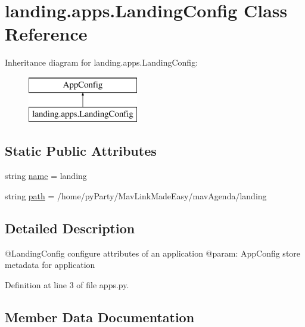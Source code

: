 \hypertarget{classlanding_1_1apps_1_1LandingConfig}{}\section{landing.\+apps.\+Landing\+Config Class Reference}
\label{classlanding_1_1apps_1_1LandingConfig}
Inheritance diagram for landing.\+apps.\+Landing\+Config\+:\begin{figure}[H]
\begin{center}
\leavevmode
\includegraphics[height=2.000000cm]{classlanding_1_1apps_1_1LandingConfig}
\end{center}
\end{figure}
\subsection*{Static Public Attributes}
\begin{DoxyCompactItemize}
\item 
string \mbox{\hyperlink{classlanding_1_1apps_1_1LandingConfig_a05dc15bad0c66f978227498ad14b2b51}{name}} = \textquotesingle{}landing\textquotesingle{}
\item 
string \mbox{\hyperlink{classlanding_1_1apps_1_1LandingConfig_a5e24228e720bc543458d2f18d457077c}{path}} = \textquotesingle{}/home/py\+Party/Mav\+Link\+Made\+Easy/mav\+Agenda/landing\textquotesingle{}
\end{DoxyCompactItemize}


\subsection{Detailed Description}
\begin{DoxyVerb}@LandingConfig configure attributes of  an application
@param: AppConfig store metadata for application
\end{DoxyVerb}
 

Definition at line 3 of file apps.\+py.



\subsection{Member Data Documentation}
\mbox{\label{classlanding_1_1apps_1_1LandingConfig_a05dc15bad0c66f978227498ad14b2b51}} 
